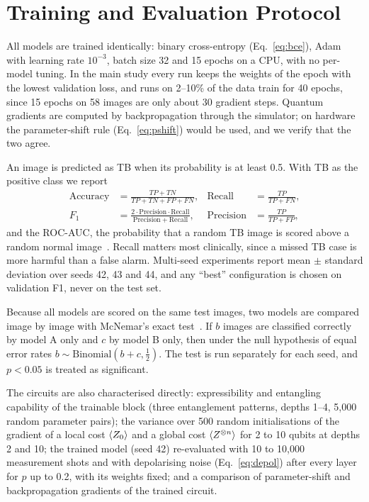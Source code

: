 \section{Training and Evaluation Protocol}
\label{sec:training}
All models are trained identically: binary cross-entropy
(Eq.~\ref{eq:bce}), Adam~\cite{kingma2015} with learning rate $10^{-3}$,
batch size 32 and 15 epochs on a CPU, with no per-model tuning. In the main
study every run keeps the weights of the epoch with the lowest validation
loss, and runs on 2--10\% of the data train for 40 epochs, since 15 epochs
on 58 images are only about 30 gradient steps. Quantum gradients are
computed by backpropagation through the simulator; on hardware the
parameter-shift rule (Eq.~\ref{eq:pshift}) would be used, and we verify that
the two agree.

\label{sec:eval}
An image is predicted as TB when its probability is at least 0.5. With TB as
the positive class we report
\begin{align}
\mathrm{Accuracy} &= \frac{TP + TN}{TP + TN + FP + FN}, &
\mathrm{Recall} &= \frac{TP}{TP + FN}, \\
F_1 &= \frac{2\cdot\mathrm{Precision}\cdot\mathrm{Recall}}{\mathrm{Precision}+\mathrm{Recall}}, &
\mathrm{Precision} &= \frac{TP}{TP + FP},
\end{align}
and the ROC-AUC, the probability that
a random TB image is scored above a random normal image~\cite{fawcett2006}.
Recall matters most clinically, since a missed TB case is more harmful than
a false alarm. Multi-seed experiments report mean $\pm$ standard deviation
over seeds 42, 43 and 44, and any ``best'' configuration is chosen on
validation F1, never on the test set.

Because all models are scored on the same test images, two models are
compared image by image with McNemar's exact test~\cite{mcnemar1947}. If $b$
images are classified correctly by model A only and $c$ by model B only, then
under the null hypothesis of equal error rates
$b \sim \mathrm{Binomial}(b + c, \tfrac{1}{2})$. The test is run separately
for each seed, and $p < 0.05$ is treated as significant.

\label{sec:qa_protocol}
The circuits are also characterised directly: expressibility and entangling
capability of the trainable block (three entanglement patterns, depths 1--4,
5,000 random parameter pairs); the variance over 500 random initialisations
of the gradient of a local cost $\left\langle Z_0\right\rangle$ and a global cost
$\left\langle Z^{\otimes n}\right\rangle$ for 2 to 10 qubits at depths 2 and 10; the trained
\cq{} model (seed 42) re-evaluated with 10 to 10,000 measurement shots and
with depolarising noise (Eq.~\ref{eq:depol}) after every layer for $p$ up to
0.2, with its weights fixed; and a comparison of parameter-shift and
backpropagation gradients of the trained circuit.
